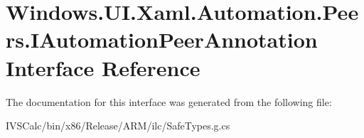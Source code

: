 \hypertarget{interface_windows_1_1_u_i_1_1_xaml_1_1_automation_1_1_peers_1_1_i_automation_peer_annotation}{}\section{Windows.\+U\+I.\+Xaml.\+Automation.\+Peers.\+I\+Automation\+Peer\+Annotation Interface Reference}
\label{interface_windows_1_1_u_i_1_1_xaml_1_1_automation_1_1_peers_1_1_i_automation_peer_annotation}


The documentation for this interface was generated from the following file\+:\begin{DoxyCompactItemize}
\item 
I\+V\+S\+Calc/bin/x86/\+Release/\+A\+R\+M/ilc/Safe\+Types.\+g.\+cs\end{DoxyCompactItemize}
